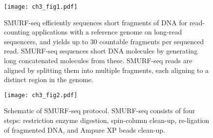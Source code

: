 \begin{figure}[b!]
\centering
\texttt{[image: ch3\_fig1.pdf]}
\caption{
  SMURF-seq efficiently sequences short fragments of DNA for
  read-counting applications with a reference genome on long-read
  sequencers, and yields up to 30 countable fragments per sequenced read.
  SMURF-seq sequences short DNA molecules by generating long concatenated
  molecules from these.  SMURF-seq reads are aligned by splitting them
  into multiple fragments, each aligning to a distinct region in the
  genome.}
\label{smurf}
\end{figure}


\begin{figure}[t!]
\centering
\texttt{[image: ch3\_fig2.pdf]}
\caption{Schematic of SMURF-seq protocol. SMURF-seq consists of four
  steps: restriction enzyme digestion, spin-column clean-up, re-ligation
  of fragmented DNA, and Ampure XP beads clean-up.}
\label{protocol}
\end{figure}


